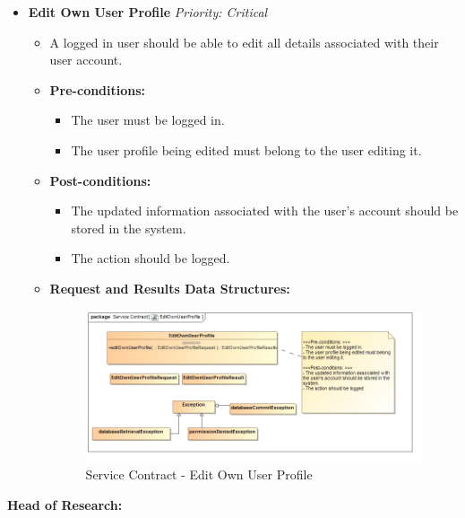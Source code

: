 \documentclass{article}
\begin{document}
\begin{itemize}
					\cleardoublepage
					\item \textbf{Edit Own User Profile} \hfill \textit{Priority: Critical}
					\begin{itemize}
						\item A logged in user should be able to edit all details associated with their user account.
						\item \textbf{Pre-conditions:}
						\begin{itemize}
							\item The user must be logged in.
							\item The user profile being edited must belong to the user editing it.
						\end{itemize}
						\item \textbf{Post-conditions:}
						\begin{itemize}
							\item The updated information associated with the user's account should be stored in the system.
							\item The action should be logged.
						\end{itemize}
						\item \textbf{Request and Results Data Structures:}
						\begin{figure}[H]
							\includegraphics[width=\linewidth]{../Diagrams/ServiceContracts/User subsystem/EditOwnUserProfile.jpg}
							\caption{Service Contract - Edit Own User Profile}
						\end{figure}
					\end{itemize}							
				\end{itemize}
				\cleardoublepage
				\textbf{Head of Research:}
				
\end{document}
